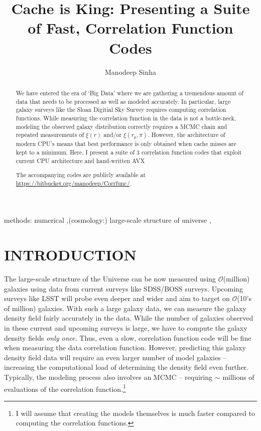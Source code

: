 \documentclass[preprint,authoryear,12pt]{elsarticle}
\begin{document}
\begin{frontmatter}

\title{Cache is King: Presenting a Suite of Fast, Correlation Function Codes}

\author[ms]{Manodeep Sinha}
\address[ms]{6902 Stevenson Center, Department of Physics \& Astronomy, Vanderbilt University, Nashville, TN 37235}

\begin{abstract}
We have entered the era of `Big Data' where we are gathering a tremendous amount of data that
needs to be processed as well as modeled accurately. In particular, large galaxy surveys
like the Sloan Digitial Sky Survey requires computing correlation functions. While measuring the
correlation function in the data is not a bottle-neck, modeling the observed galaxy distribution correctly
{\em} requires a MCMC chain and repeated measurements of $\xi(r)$ and/or $\xi(r_p,\pi)$. However, 
the architecture of modern CPU's means that best performance is only obtained when cache misses 
are kept to a minimum. Here, I present a suite of 3 correlation function codes that exploit 
current CPU architecture and hand-written AVX  


The accompanying codes are publicly available at \url{https://bitbucket.org/manodeep/Corrfunc/}. 
\end{abstract}

\begin{keyword}
methods: numerical \sep (cosmology:) large-scale structure of universe \sep
\end{keyword}

\end{frontmatter}

\section{INTRODUCTION}
The large-scale structure of the Universe can be now measured using $\mathcal{O}$(million) galaxies 
using data from current surveys like SDSS/BOSS surveys. Upcoming surveys like LSST will probe even 
deeper and wider and aim to target on $\mathcal{O}$(10's of million) galaxies. With such a large galaxy data, 
we can measure the galaxy density field fairly accurately in the data. While the number of galaxies observed 
in these current and upcoming surveys is large, we have to compute the galaxy density fields {\em only once}. Thus, 
even a slow, correlation function code will be fine when measuring the data correlation function. 
However, predicting this galaxy  density field data will require an even larger number of model galaxies -- increasing the computational 
load of determining the density field even further. Typically, the modeling process also involves an MCMC -- 
requiring $\sim$ millions of evaluations of the correlation function.\footnote{I will assume that creating the models themselves 
is much faster compared to computing the correlation functions.} 
\end{document}

